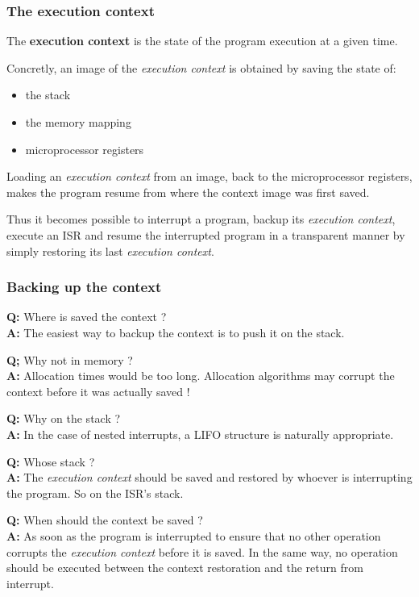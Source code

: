 \begin{frame}
  \frametitle{The execution context}

  The {\bf execution context} is the state of the program execution at a given
  time.

  \-

  Concretly, an image of the {\em execution context} is obtained by saving
  the state of:

  \begin{itemize}
    \item the stack
    \item the memory mapping
    \item microprocessor registers
  \end{itemize}

  \-

  Loading an {\em execution context} from an image, back to the microprocessor
  registers, makes the program resume from where the context image was first
  saved.

  \-

  Thus it becomes possible to interrupt a program, backup its {\em execution
  context}, execute an ISR and resume the interrupted program in a transparent
  manner by simply restoring its last {\em execution context}.

\end{frame}

%
%
%

\begin{frame}
  \frametitle{Backing up the context}

  {\bf Q:} Where is saved the context ?\\
  {\bf A:} The easiest way to backup the context is to push it on the stack.

  \-

  {\bf Q;} Why not in memory ?\\
  {\bf A:} Allocation times would be too long. Allocation algorithms may
  corrupt the context before it was actually saved !

  \-

  {\bf Q:} Why on the stack ?\\
  {\bf A:} In the case of nested interrupts, a LIFO structure is naturally
  appropriate.

  \-

  {\bf Q:} Whose stack ?\\
  {\bf A:} The {\em execution context} should be saved and restored by whoever is
  interrupting the program. So on the ISR's stack.

  \-

  {\bf Q:} When should the context be saved ?\\
  {\bf A:} As soon as the program is interrupted to ensure that no other
  operation corrupts the {\em execution context} before it is saved. In the same
  way, no operation should be executed between the context restoration and the
  return from interrupt.

\end{frame}

